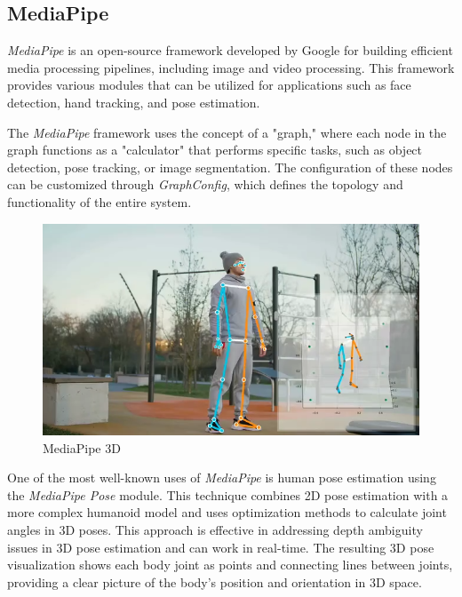 \subsection{MediaPipe}
\label{subsec:MediaPipe}

\emph{MediaPipe} is an open-source framework developed by Google for building efficient media processing pipelines, including image and video processing. This framework provides various modules that can be utilized for applications such as face detection, hand tracking, and pose estimation.

The \emph{MediaPipe} framework uses the concept of a "graph," where each node in the graph functions as a "calculator" that performs specific tasks, such as object detection, pose tracking, or image segmentation. The configuration of these nodes can be customized through \emph{GraphConfig}, which defines the topology and functionality of the entire system.

\begin{figure}[H]
  \centering
  \includegraphics[scale=0.35]{gambar/MediaPipe3D.png}
  \caption{MediaPipe 3D}
  \label{fig:MediaPipe3D}
\end{figure}

One of the most well-known uses of \emph{MediaPipe} is human pose estimation using the \emph{MediaPipe Pose} module. This technique combines 2D pose estimation with a more complex humanoid model and uses optimization methods to calculate joint angles in 3D poses. This approach is effective in addressing depth ambiguity issues in 3D pose estimation and can work in real-time. The resulting 3D pose visualization shows each body joint as points and connecting lines between joints, providing a clear picture of the body's position and orientation in 3D space.

\vspace{5pt}
